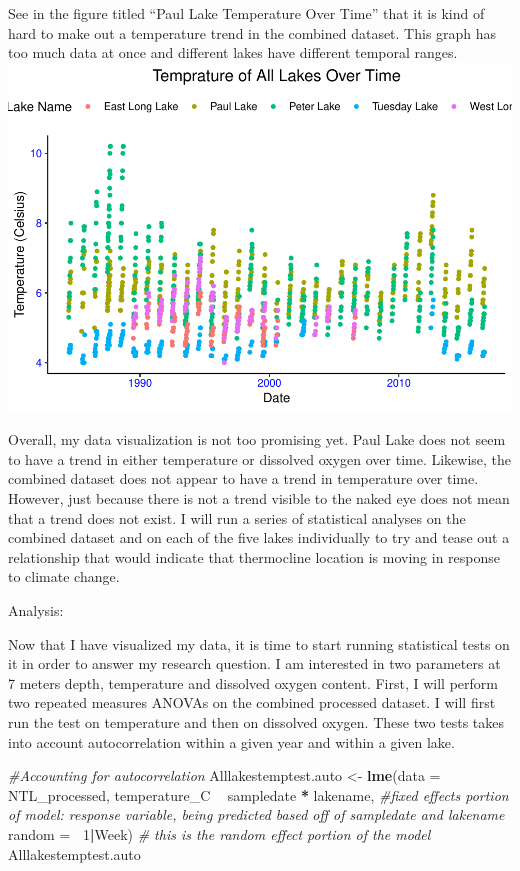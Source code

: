 \documentclass[12pt,]{article}
\newenvironment{Shaded}{\begin{snugshade}}{\end{snugshade}}
\newcommand{\KeywordTok}[1]{\textcolor[rgb]{0.13,0.29,0.53}{\textbf{#1}}}
\newcommand{\DataTypeTok}[1]{\textcolor[rgb]{0.13,0.29,0.53}{#1}}
\newcommand{\DecValTok}[1]{\textcolor[rgb]{0.00,0.00,0.81}{#1}}
\newcommand{\StringTok}[1]{\textcolor[rgb]{0.31,0.60,0.02}{#1}}
\newcommand{\CommentTok}[1]{\textcolor[rgb]{0.56,0.35,0.01}{\textit{#1}}}
\newcommand{\OperatorTok}[1]{\textcolor[rgb]{0.81,0.36,0.00}{\textbf{#1}}}
\newcommand{\NormalTok}[1]{#1}
\begin{document}
See in the figure titled ``Paul Lake Temperature Over Time'' that it is
kind of hard to make out a temperature trend in the combined dataset.
This graph has too much data at once and different lakes have different
temporal ranges.
\includegraphics{KeithBollt_ENV872_FinalProject_files/figure-latex/visualization5-1.pdf}

Overall, my data visualization is not too promising yet. Paul Lake does
not seem to have a trend in either temperature or dissolved oxygen over
time. Likewise, the combined dataset does not appear to have a trend in
temperature over time. However, just because there is not a trend
visible to the naked eye does not mean that a trend does not exist. I
will run a series of statistical analyses on the combined dataset and on
each of the five lakes individually to try and tease out a relationship
that would indicate that thermocline location is moving in response to
climate change.

Analysis:

Now that I have visualized my data, it is time to start running
statistical tests on it in order to answer my research question. I am
interested in two parameters at 7 meters depth, temperature and
dissolved oxygen content. First, I will perform two repeated measures
ANOVAs on the combined processed dataset. I will first run the test on
temperature and then on dissolved oxygen. These two tests takes into
account autocorrelation within a given year and within a given lake.

\begin{Shaded}
\begin{Highlighting}[]
\CommentTok{#Accounting for autocorrelation}
\NormalTok{Alllakestemptest.auto <-}\StringTok{ }\KeywordTok{lme}\NormalTok{(}\DataTypeTok{data =}\NormalTok{ NTL_processed, }
\NormalTok{                     temperature_C }\OperatorTok{~}\StringTok{ }\NormalTok{sampledate }\OperatorTok{*}\StringTok{ }\NormalTok{lakename, }\CommentTok{#fixed effects portion of model: response variable, being predicted based off of sampledate and lakename}
                     \DataTypeTok{random =} \OperatorTok{~}\DecValTok{1}\OperatorTok{|}\NormalTok{Week)  }\CommentTok{# this is the random effect portion of the model}
\NormalTok{Alllakestemptest.auto}
\end{Highlighting}
\end{Shaded}
\end{document}
